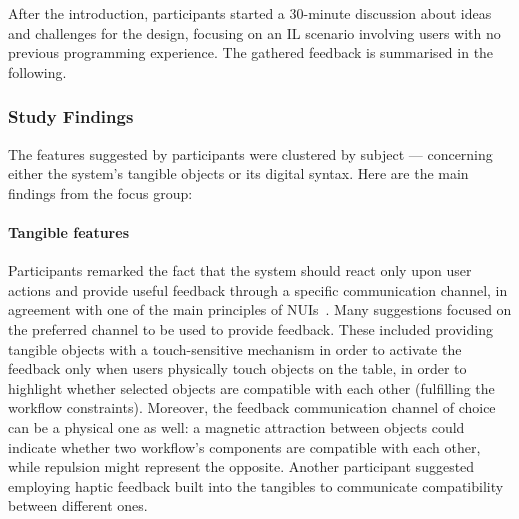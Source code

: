 After the introduction, participants started a 30-minute discussion about ideas and challenges for the design, focusing on an \ac{IL} scenario involving users with no previous programming experience. The gathered feedback is summarised in the following.

\subsubsection{Study Findings}
The features suggested by participants were clustered by subject --- concerning either the system's tangible objects or its digital syntax. Here are the main findings from the focus group:

\paragraph{Tangible features} Participants remarked the fact that the system should react only upon user actions and provide useful feedback through a specific communication channel, in agreement with one of the main principles of \acp{NUI}~\cite{Wigdor:2011bi}. Many suggestions focused on the preferred channel to be used to provide feedback. These included providing tangible objects with a touch-sensitive mechanism in order to activate the feedback only when users physically touch objects on the table, in order to highlight whether selected objects are compatible with each other (fulfilling the workflow constraints). Moreover, the feedback communication channel of choice can be a physical one as well: a magnetic attraction between objects could indicate whether two workflow's components are compatible with each other, while repulsion might represent the opposite. An\-oth\-er par\-tic\-i\-pant sug\-gest\-ed employing haptic feedback built into the tangibles to communicate compatibility between different ones.

